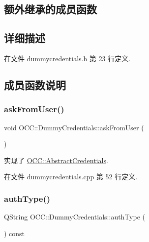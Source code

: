\subsection*{额外继承的成员函数}


\subsection{详细描述}


在文件 dummycredentials.\+h 第 23 行定义.



\subsection{成员函数说明}
\mbox{\label{class_o_c_c_1_1_dummy_credentials_aa75b74ddf9cbabb2d1fe95b7e641b2aa}} 
\subsubsection{\texorpdfstring{ask\+From\+User()}{askFromUser()}}
{\footnotesize\ttfamily void O\+C\+C\+::\+Dummy\+Credentials\+::ask\+From\+User (\begin{DoxyParamCaption}{ }\end{DoxyParamCaption})\hspace{0.3cm}{\ttfamily [virtual]}}



实现了 \hyperlink{class_o_c_c_1_1_abstract_credentials_ade846fa97d67c4fd368e01acebd8c977}{O\+C\+C\+::\+Abstract\+Credentials}.



在文件 dummycredentials.\+cpp 第 52 行定义.

\mbox{\label{class_o_c_c_1_1_dummy_credentials_af712b0e77040f513ab91771cdc167f16}} 
\subsubsection{\texorpdfstring{auth\+Type()}{authType()}}
{\footnotesize\ttfamily Q\+String O\+C\+C\+::\+Dummy\+Credentials\+::auth\+Type (\begin{DoxyParamCaption}{ }\end{DoxyParamCaption}) const\hspace{0.3cm}{\ttfamily [virtual]}}



